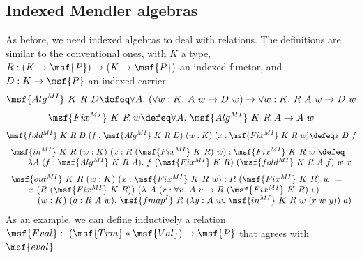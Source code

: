 \documentclass[submission,copyright,creativecommons]{eptcs}
\begin{document}
\subsection{Indexed Mendler algebras}

As before, we need indexed algebras to deal with relations.  The
definitions are similar to the conventional ones, with $K$ a type, $R:
(K \to \msf{P}) \to (K \to \msf{P}) $ an indexed functor, and $D: K
\to \msf{P}$ an indexed carrier.
\begin{gather}  \msf{Alg^{MI}} \ K \ R \ D \defeq 
\forall A. \ (\forall w:K. \ A \ w \to D \ w) \to \forall w:K. \ R
\ A \ w \to D \ w 
 \end{gather} 
\begin{gather}  \msf{Fix^{MI}} \ K \ R \ w \defeq  
\forall A. \ \msf{Alg^{MI}} \ K \ R \ A \to A \ w
 \end{gather} 
\begin{gather}  \msf{fold^{MI}} \ K \ R \ D \ 
(f: \msf{Alg^{MI}} \ K \ R \ D) \ (w: K) \ (x: \msf{Fix^{MI}} \ K \ R
  \ w) \defeq x \ D \ f \end{gather}
\begin{gather}  
\begin{array}{lll}
\msf{in^{MI}} \ K \ R \ (w: K) \ (x: R \ (\msf{Fix^{MI}} \ K \ R) \ w):
\msf{Fix^{MI}} \ K \ R \ w \ \defeq \\
\qquad \lambda A \ (f: \msf{Alg^{MI}} \ K \ R \ A). \ f
\ (\msf{Fix^{MI}} \ K \ R) \ (\msf{fold^{MI}} \ K \ R \ A \ f) \ w \ x
\end{array}
 \end{gather} 
\begin{gather} 
\begin{array}{lll}
 \msf{out^{MI}} \ K \ R \ (w: K) \ (x: \msf{Fix^{MI}} \ K \ R \ w) : R
 \ (\msf{Fix^{MI}} \ K \ R) \ w \ = \\
\qquad x \ (R \ (\msf{Fix^{MI}} \ K \ R)) \ (\lambda \ A \ (r: \forall
v. \ A \ v \to R \ (\msf{Fix^{MI}} \ K \ R) \ v) \\ \qquad 
\quad (w: K) \ (a: R \ A \ w). \ \msf{fmap^{I}} \ R \ (\lambda y:A
\ w. \ \msf{in^{MI}} \ K \ R \ w \ (r \ w \ y)) \ a)
\end{array}
\end{gather} 
As an example, we can define inductively a relation $\msf{Eval}:
\ (\msf{Trm} * \msf{Val}) \to \msf{P}$
that agrees with $\msf{eval}$.
\end{document}

